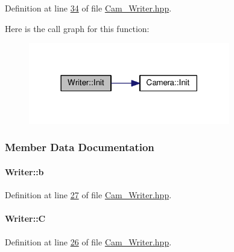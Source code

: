 Definition at line \hyperlink{Cam__Writer_8hpp_source_l00034}{34} of file \hyperlink{Cam__Writer_8hpp_source}{Cam\+\_\+\+Writer.\+hpp}.



Here is the call graph for this function\+:\nopagebreak
\begin{figure}[H]
\begin{center}
\leavevmode
\includegraphics[width=249pt]{classWriter_a4193b0f06fb33e260e5eb26ea9356a1c_cgraph}
\end{center}
\end{figure}




\subsubsection{Member Data Documentation}
\paragraph[{\texorpdfstring{b}{b}}]{ Writer\+::b}\hypertarget{classWriter_ab564a66fcd4c18866c3cddc48682d198}{}\label{classWriter_ab564a66fcd4c18866c3cddc48682d198}


Definition at line \hyperlink{Cam__Writer_8hpp_source_l00027}{27} of file \hyperlink{Cam__Writer_8hpp_source}{Cam\+\_\+\+Writer.\+hpp}.

\paragraph[{\texorpdfstring{C}{C}}]{ Writer\+::C}\hypertarget{classWriter_a5bd1f2b9e0a6250fc48d2f34cd2260e8}{}\label{classWriter_a5bd1f2b9e0a6250fc48d2f34cd2260e8}


Definition at line \hyperlink{Cam__Writer_8hpp_source_l00026}{26} of file \hyperlink{Cam__Writer_8hpp_source}{Cam\+\_\+\+Writer.\+hpp}.

